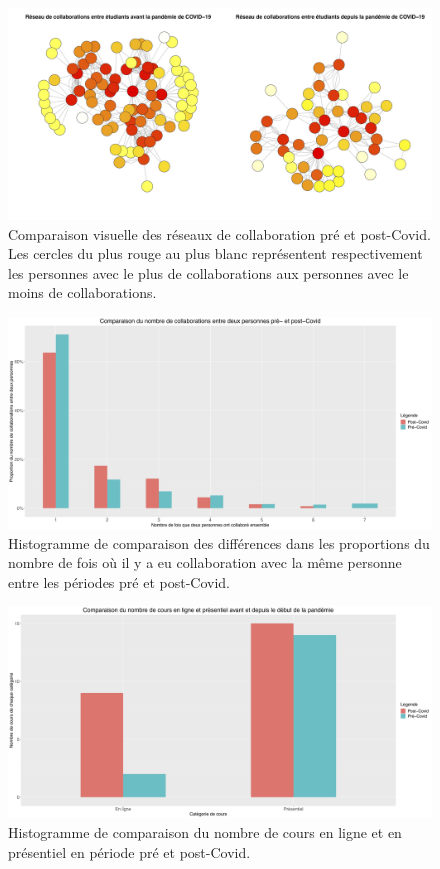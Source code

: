 \documentclass{article}
\begin{document}
 \begin{figure}[bp!]
\centerline{\includegraphics[scale=0.15]{Reseau_comparaison.jpg}}
\caption{Comparaison visuelle des réseaux de collaboration pré et post-Covid. Les cercles du plus rouge au plus blanc représentent respectivement les personnes avec le plus de collaborations aux personnes avec le moins de collaborations. }
\label{fig}
\end{figure}
 \begin{figure}[bp!]
\centerline{\includegraphics[scale=0.15]{Histogramme2.jpg}}
\caption{Histogramme de comparaison des différences dans les proportions du nombre de fois où il y a eu collaboration avec la même personne entre les périodes pré et post-Covid.}
\label{fig}
\end{figure}

 \begin{figure}[bp!]
\centerline{\includegraphics[scale=0.15]{Histogramme4.jpg}}
\caption{Histogramme de comparaison du nombre de cours en ligne et en présentiel en période pré et post-Covid.}
\label{fig}
\end{figure}
 
\end{document}
